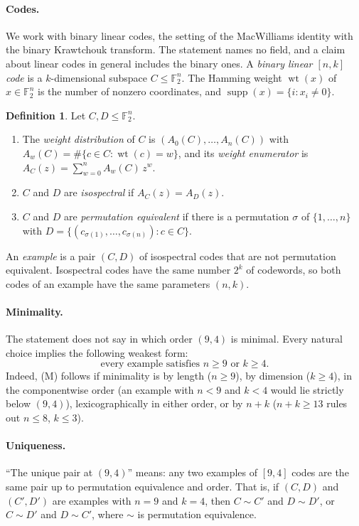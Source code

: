 \documentclass[11pt]{article}
\theoremstyle{plain}
\theoremstyle{definition}
\newtheorem{definition}[theorem]{Definition}
\theoremstyle{remark}
\newcommand{\F}{\mathbb F}
\newcommand{\wt}{\operatorname{wt}}
\newcommand{\supp}{\operatorname{supp}}
\begin{document}
\paragraph{Codes.} We work with binary linear codes, the setting of the MacWilliams
identity with the binary Krawtchouk transform. The statement names no field, and a
claim about linear codes in general includes the binary ones. A \emph{binary linear
$[n,k]$ code} is a $k$-dimensional subspace $C\le\F_2^n$. The Hamming weight
$\wt(x)$ of $x\in\F_2^n$ is the number of nonzero coordinates, and
$\supp(x)=\{i:x_i\ne0\}$.

\begin{definition}
Let $C,D\le\F_2^n$.
\begin{enumerate}
\item The \emph{weight distribution} of $C$ is $(A_0(C),\dots,A_n(C))$ with
  $A_w(C)=\#\{c\in C:\wt(c)=w\}$, and its \emph{weight enumerator} is
  $A_C(z)=\sum_{w=0}^n A_w(C)\,z^w$.
\item $C$ and $D$ are \emph{isospectral} if $A_C(z)=A_D(z)$.
\item $C$ and $D$ are \emph{permutation equivalent} if there is a permutation
  $\sigma$ of $\{1,\dots,n\}$ with $D=\{(c_{\sigma(1)},\dots,c_{\sigma(n)}):c\in C\}$.
\end{enumerate}
\end{definition}

An \emph{example} is a pair $(C,D)$ of isospectral codes that are not permutation
equivalent. Isospectral codes have the same number $2^k$ of codewords, so both codes
of an example have the same parameters $(n,k)$.

\paragraph{Minimality.} The statement does not say in which order $(9,4)$ is
minimal. Every natural choice implies the following weakest form:
\begin{equation}\label{eq:min}
\text{every example satisfies } n\ge9 \text{ or } k\ge4. \tag{M}
\end{equation}
Indeed, (M) follows if minimality is by length ($n\ge9$), by dimension ($k\ge4$),
in the componentwise order (an example with $n<9$ and $k<4$ would lie strictly below
$(9,4)$), lexicographically in either order, or by $n+k$ ($n+k\ge13$ rules out
$n\le8$, $k\le3$).

\paragraph{Uniqueness.} ``The unique pair at $(9,4)$'' means: any two examples of
$[9,4]$ codes are the same pair up to permutation equivalence and order. That is, if
$(C,D)$ and $(C',D')$ are examples with $n=9$ and $k=4$, then $C\sim C'$ and $D\sim
D'$, or $C\sim D'$ and $D\sim C'$, where $\sim$ is permutation equivalence.
\end{document}

